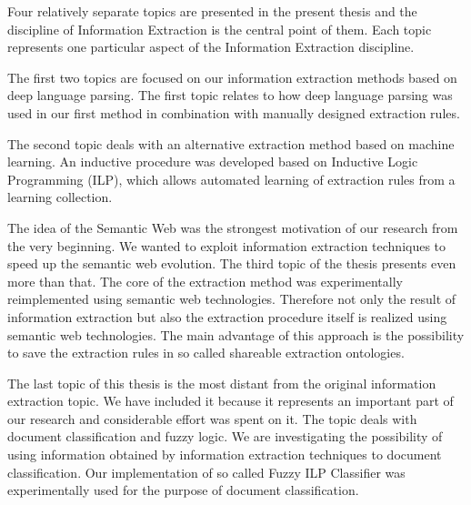 
\graphicspath{{../img/ch10/}}


Four relatively separate topics are presented in the present thesis and the discipline of Information Extraction is the central point of them. Each topic represents one particular aspect of the Information Extraction discipline.

The first two topics are focused on our information extraction methods based on deep language parsing. The first topic relates to how deep language parsing was used in our first method in combination with manually designed extraction rules.

The second topic deals with an alternative extraction method based on machine learning. An inductive procedure was developed based on Inductive Logic Programming (ILP), which allows automated learning of extraction rules from a learning collection.

The idea of the Semantic Web was the strongest motivation of our research from the very beginning. We wanted to exploit information extraction techniques to speed up the semantic web evolution. The third topic of the thesis presents even more than that. The core of the extraction method was experimentally reimplemented using semantic web technologies. Therefore not only the result of information extraction but also the extraction procedure itself is realized using semantic web technologies. The main advantage of this approach is the possibility to save the extraction rules in so called shareable extraction ontologies.

The last topic of this thesis is the most distant from the original information extraction topic. We have included it because it represents an important part of our research and considerable effort was spent on it. The topic deals with document classification and fuzzy logic. We are investigating the possibility of using information obtained by information extraction techniques to document classification. Our implementation of so called Fuzzy ILP Classifier was experimentally used for the purpose of document classification.

